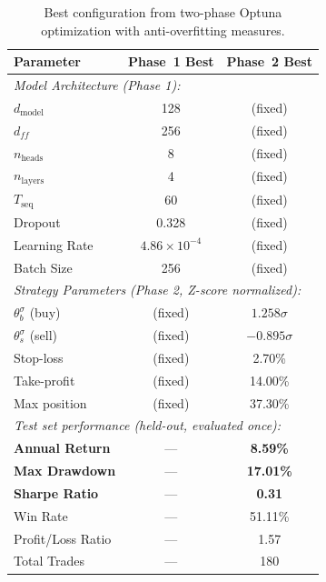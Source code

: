 \documentclass[12pt, a4paper]{article}
\begin{document}
\begin{table}[htbp]
\centering
\caption{Best configuration from two-phase Optuna optimization with anti-overfitting measures.}
\label{tab:optuna_best}
\small
\begin{tabular}{lcc}
\toprule
\textbf{Parameter} & \textbf{Phase~1 Best} & \textbf{Phase~2 Best} \\
\midrule
\multicolumn{3}{l}{\textit{Model Architecture (Phase 1):}} \\
$d_{\text{model}}$     & 128   & (fixed) \\
$d_{ff}$               & 256   & (fixed) \\
$n_{\text{heads}}$     & 8     & (fixed) \\
$n_{\text{layers}}$    & 4     & (fixed) \\
$T_{\text{seq}}$       & 60    & (fixed) \\
Dropout                & 0.328 & (fixed) \\
Learning Rate          & $4.86 \times 10^{-4}$ & (fixed) \\
Batch Size             & 256   & (fixed) \\
\midrule
\multicolumn{3}{l}{\textit{Strategy Parameters (Phase 2, Z-score normalized):}} \\
$\theta_b^\sigma$ (buy)    & (fixed) & $1.258\sigma$ \\
$\theta_s^\sigma$ (sell)   & (fixed) & $-0.895\sigma$ \\
Stop-loss              & (fixed) & 2.70\% \\
Take-profit            & (fixed) & 14.00\% \\
Max position           & (fixed) & 37.30\% \\
\midrule
\multicolumn{3}{l}{\textit{Test set performance (held-out, evaluated once):}} \\
\textbf{Annual Return} & --- & \textbf{8.59\%} \\
\textbf{Max Drawdown}  & --- & \textbf{17.01\%} \\
\textbf{Sharpe Ratio}  & --- & \textbf{0.31} \\
Win Rate               & --- & 51.11\% \\
Profit/Loss Ratio      & --- & 1.57 \\
Total Trades           & --- & 180 \\
\bottomrule
\end{tabular}
\end{table}
\end{document}
